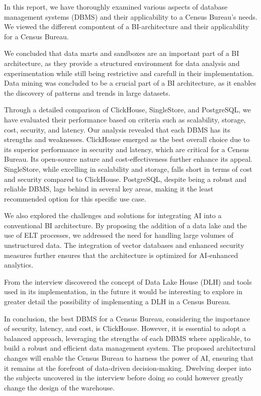 In this report, we have thoroughly examined various aspects of database management systems (DBMS) 
and their applicability to a Census Bureau's needs. 
We viewed the different compontent of a BI-architecture and their applicability for a Census Bureau.

We concluded that data marts and sandboxes are an important part of a BI architecture,
as they provide a structured environment for data analysis and experimentation while still being restrictive and carefull in their implementation.
Data mining was concluded to be a crucial part of a BI architecture,
as it enables the discovery of patterns and trends in large datasets.

Through a detailed comparison of ClickHouse, SingleStore, and PostgreSQL, 
we have evaluated their performance based on criteria such as scalability, 
storage, cost, security, and latency.
Our analysis revealed that each DBMS has its strengths and weaknesses. 
ClickHouse emerged as the best overall choice due to its superior performance in 
security and latency, which are critical for a Census Bureau. 
Its open-source nature and cost-effectiveness further enhance its appeal. 
SingleStore, while excelling in scalability and storage, 
falls short in terms of cost and security compared to ClickHouse. 
PostgreSQL, despite being a robust and reliable DBMS, lags behind in several key areas, 
making it the least recommended option for this specific use case.



We also explored the challenges and solutions for integrating AI into 
a conventional BI architecture. 
By proposing the addition of a data lake and the use of ELT processes, 
we addressed the need for handling large volumes of unstructured data. 
The integration of vector databases and enhanced security measures further ensures that 
the architecture is optimized for AI-enhanced analytics.

From the interview discovered the concept of Data Lake House (DLH) and tools used in its implementation,
in the future it would be interesting to explore in greater detail the possibility of implementing a DLH in a Census Bureau.

In conclusion, the best DBMS for a Census Bureau, 
considering the importance of security, latency, and cost, is ClickHouse. 
However, it is essential to adopt a balanced approach, 
leveraging the strengths of each DBMS where applicable, 
to build a robust and efficient data management system. 
The proposed architectural changes will enable the Census Bureau to harness the power of AI, 
ensuring that it remains at the forefront of data-driven decision-making.
Dwelving deeper into the subjects uncovered in the interview before doing so could 
however greatly change the design of the warehouse. 
